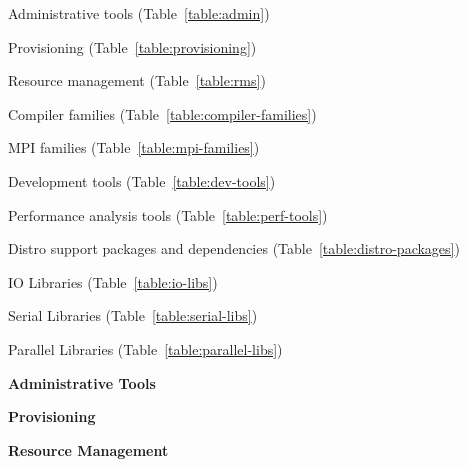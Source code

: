 \begin{itemize*}
\item Administrative tools (Table~\ref{table:admin})
\item Provisioning (Table~\ref{table:provisioning})
\item Resource management (Table~\ref{table:rms})
\item Compiler families (Table~\ref{table:compiler-families})
\item MPI families (Table~\ref{table:mpi-families})
\item Development tools (Table~\ref{table:dev-tools})
\item Performance analysis tools (Table~\ref{table:perf-tools})
\item Distro support packages and dependencies (Table~\ref{table:distro-packages})
\item IO Libraries (Table~\ref{table:io-libs})
\item Serial Libraries (Table~\ref{table:serial-libs})
\item Parallel Libraries (Table~\ref{table:parallel-libs})
\end{itemize*}

\newcommand{\firstColWidth}{3.5cm}
\newcommand{\secondColWidth}{1.5cm}

\vspace*{1.0cm}

\begin{table}[h]
\caption{\bf Administrative Tools} \vspace*{\captionSpace{}} \label{table:admin}

\end{table}
\vspace*{0.5cm}

\renewcommand{\firstColWidth}{4.5cm}
\renewcommand{\secondColWidth}{2.0cm}


\begin{table}[h!]
\caption{\bf Provisioning} \vspace*{\captionSpace{}} \label{table:provisioning}

\vspace*{\tabSpaceBot{}}
\end{table} 

\begin{table}[h!]
\caption{\bf Resource Management} \vspace*{\captionSpace{}} \label{table:rms}

\vspace*{\tabSpaceBot{}}
\end{table}

